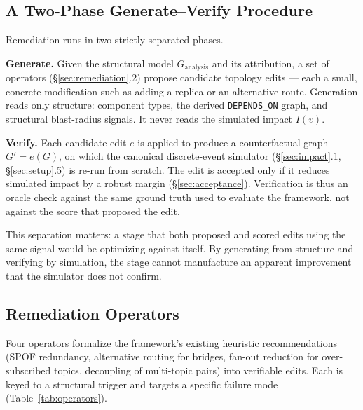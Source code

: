 \documentclass[review]{elsarticle}
\begin{document}
\subsection{A Two-Phase Generate--Verify Procedure}

Remediation runs in two strictly separated phases.

\textbf{Generate.} Given the structural model $G_{\text{analysis}}$ and its attribution, a set of
operators (\S\ref{sec:remediation}.2) propose candidate topology edits --- each a small, concrete
modification such as adding a replica or an alternative route. Generation reads only structure:
component types, the derived \texttt{DEPENDS\_ON} graph, and structural blast-radius signals. It
never reads the simulated impact $I(v)$.

\textbf{Verify.} Each candidate edit $e$ is applied to produce a counterfactual graph $G' = e(G)$, on
which the canonical discrete-event simulator (\S\ref{sec:impact}.1, \S\ref{sec:setup}.5) is re-run
from scratch. The edit is accepted only if it reduces simulated impact by a robust margin
(\S\ref{sec:acceptance}). Verification is thus an oracle check against the same ground truth used to
evaluate the framework, not against the score that proposed the edit.

This separation matters: a stage that both proposed and scored edits using the same signal would be
optimizing against itself. By generating from structure and verifying by simulation, the stage
cannot manufacture an apparent improvement that the simulator does not confirm.

\subsection{Remediation Operators}

Four operators formalize the framework's existing heuristic recommendations (SPOF redundancy,
alternative routing for bridges, fan-out reduction for over-subscribed topics, decoupling of
multi-topic pairs) into verifiable edits. Each is keyed to a structural trigger and targets a
specific failure mode (Table~\ref{tab:operators}).
\end{document}
